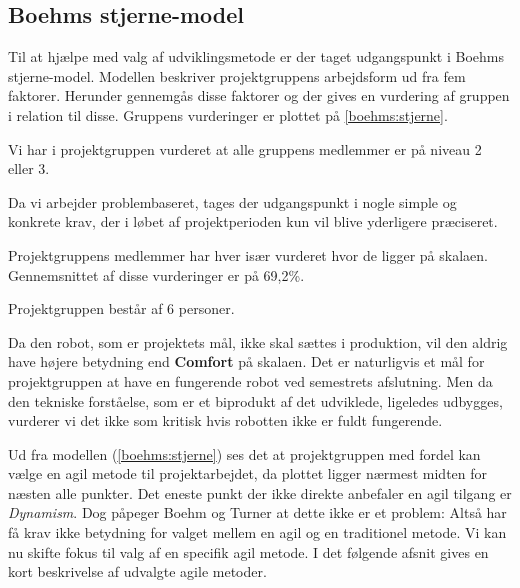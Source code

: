 \subsection{Boehms stjerne-model}
Til at hjælpe med valg af udviklingsmetode er der taget udgangspunkt i Boehms stjerne-model\cite{boehm}.
Modellen beskriver projektgruppens arbejdsform ud fra fem faktorer.
Herunder gennemgås disse faktorer og der gives en vurdering af gruppen i relation til disse.
Gruppens vurderinger er plottet på \cref{boehms:stjerne}.


\begin{description}
{Vi har i projektgruppen vurderet at alle gruppens medlemmer er på niveau 2 eller 3.}

{Da vi arbejder problembaseret, tages der udgangspunkt i nogle simple og konkrete krav, der i løbet af projektperioden kun vil blive yderligere præciseret.}

{Projektgruppens medlemmer har hver især vurderet hvor de ligger på skalaen.
Gennemsnittet af disse vurderinger er på 69,2\%.}

{Projektgruppen består af 6 personer.}

{Da den robot, som er projektets mål, ikke skal sættes i produktion, vil den aldrig have højere betydning end \textbf{Comfort} på skalaen.
Det er naturligvis et mål for projektgruppen at have en fungerende robot ved semestrets afslutning.
Men da den tekniske forståelse, som er et biprodukt af det udviklede, ligeledes udbygges, vurderer vi det ikke som kritisk hvis robotten ikke er fuldt fungerende.}
\end{description}

Ud fra modellen (\cref{boehms:stjerne}) ses det at projektgruppen med fordel kan vælge en agil metode til projektarbejdet, da plottet ligger nærmest midten for næsten alle punkter.
Det eneste punkt der ikke direkte anbefaler en agil tilgang er \emph{Dynamism}.
Dog påpeger Boehm og Turner \cite[side 2]{boehm} at dette ikke er et problem:
Altså har få krav ikke betydning for valget mellem en agil og en traditionel metode.
Vi kan nu skifte fokus til valg af en specifik agil metode.
I det følgende afsnit gives en kort beskrivelse af udvalgte agile metoder.